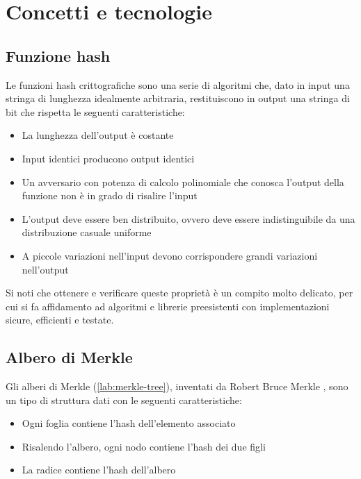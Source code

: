 \chapter{Concetti e tecnologie}

\section{Funzione hash}
Le funzioni hash crittografiche sono una serie di algoritmi che, dato in input una stringa di lunghezza idealmente arbitraria,
restituiscono in output una stringa di bit che rispetta le seguenti caratteristiche:

\begin{itemize}
    \item La lunghezza dell'output è costante
    \item Input identici producono output identici
    \item Un avversario con potenza di calcolo polinomiale che conosca l'output della funzione non è in grado di risalire l'input
    \item L'output deve essere ben distribuito, ovvero deve essere indistinguibile da una distribuzione casuale uniforme
    \item A piccole variazioni nell'input devono corrispondere grandi variazioni nell'output
\end{itemize}

Si noti che ottenere e verificare queste proprietà è un compito molto delicato,
per cui si fa affidamento ad algoritmi e librerie preesistenti con implementazioni sicure, efficienti e testate.


\section{Albero di Merkle}
\label{sec:merkle-tree}
Gli alberi di Merkle (\autoref{lab:merkle-tree}), inventati da Robert Bruce Merkle \cite{art:merkle}, sono un tipo di struttura dati con le seguenti caratteristiche:

\begin{itemize}
    \item Ogni foglia contiene l'hash dell'elemento associato
    \item Risalendo l'albero, ogni nodo contiene l'hash dei due figli
    \item La radice contiene l'hash dell'albero
\end{itemize}

